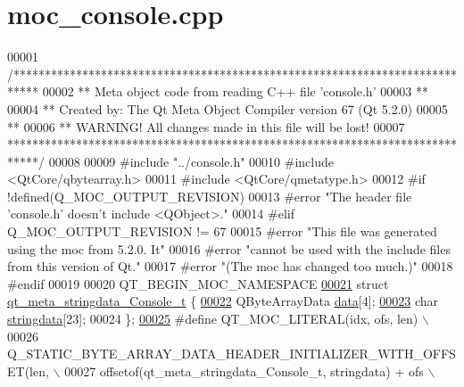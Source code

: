 \hypertarget{a00064_source}{\section{moc\+\_\+console.\+cpp}
\label{a00064_source}
}

\begin{DoxyCode}
00001 \textcolor{comment}{/****************************************************************************}
00002 \textcolor{comment}{** Meta object code from reading C++ file 'console.h'}
00003 \textcolor{comment}{**}
00004 \textcolor{comment}{** Created by: The Qt Meta Object Compiler version 67 (Qt 5.2.0)}
00005 \textcolor{comment}{**}
00006 \textcolor{comment}{** WARNING! All changes made in this file will be lost!}
00007 \textcolor{comment}{*****************************************************************************/}
00008 
00009 \textcolor{preprocessor}{#include "../console.h"}
00010 \textcolor{preprocessor}{#include <QtCore/qbytearray.h>}
00011 \textcolor{preprocessor}{#include <QtCore/qmetatype.h>}
00012 \textcolor{preprocessor}{#if !defined(Q\_MOC\_OUTPUT\_REVISION)}
00013 \textcolor{preprocessor}{#error "The header file 'console.h' doesn't include <QObject>."}
00014 \textcolor{preprocessor}{#elif Q\_MOC\_OUTPUT\_REVISION != 67}
00015 \textcolor{preprocessor}{#error "This file was generated using the moc from 5.2.0. It"}
00016 \textcolor{preprocessor}{#error "cannot be used with the include files from this version of Qt."}
00017 \textcolor{preprocessor}{#error "(The moc has changed too much.)"}
00018 \textcolor{preprocessor}{#endif}
00019 
00020 QT\_BEGIN\_MOC\_NAMESPACE
\hypertarget{a00064_source_l00021}{}\hyperlink{a00064}{00021} \textcolor{keyword}{struct }\hyperlink{a00064_d6/daa/a00187}{qt\_meta\_stringdata\_Console\_t} \{
\hypertarget{a00064_source_l00022}{}\hyperlink{a00064_af7131d57b034ad13a178d273cfee74c2}{00022}     QByteArrayData \hyperlink{a00064_af7131d57b034ad13a178d273cfee74c2}{data}[4];
\hypertarget{a00064_source_l00023}{}\hyperlink{a00064_a63ab346e732e08dad62cdef78b05d53d}{00023}     \textcolor{keywordtype}{char} \hyperlink{a00064_a63ab346e732e08dad62cdef78b05d53d}{stringdata}[23];
00024 \};
\hypertarget{a00064_source_l00025}{}\hyperlink{a00064_a75bb9482d242cde0a06c9dbdc6b83abe}{00025} \textcolor{preprocessor}{#define QT\_MOC\_LITERAL(idx, ofs, len) \(\backslash\)}
00026 \textcolor{preprocessor}{    Q\_STATIC\_BYTE\_ARRAY\_DATA\_HEADER\_INITIALIZER\_WITH\_OFFSET(len, \(\backslash\)}
00027 \textcolor{preprocessor}{    offsetof(qt\_meta\_stringdata\_Console\_t, stringdata) + ofs \(\backslash\)}

\end{DoxyCode}
